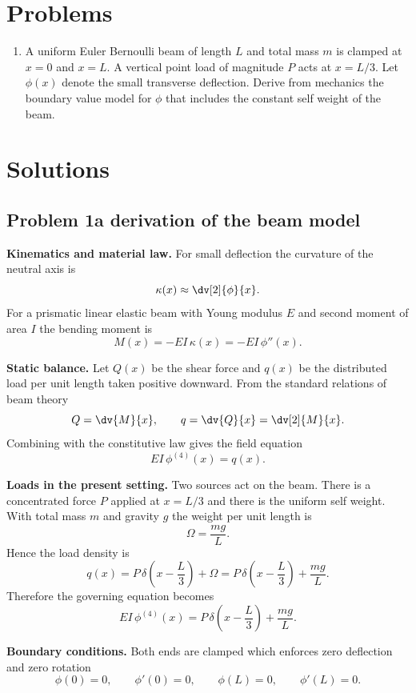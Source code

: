 \documentclass[12pt, a4paper]{article}
\begin{document}
\newpage
\section*{Problems}

\begin{enumerate}[leftmargin=1.2em,label=\arabic*.]
  \item A uniform Euler Bernoulli beam of length $L$ and total mass $m$ is clamped at $x=0$ and $x=L$.
  A vertical point load of magnitude $P$ acts at $x=L/3$.
  Let $\phi(x)$ denote the small transverse deflection.
  Derive from mechanics the boundary value model for $\phi$ that includes the constant self weight of the beam.
\end{enumerate}

\newpage
\section*{Solutions}

\subsection*{Problem 1a  derivation of the beam model}

\textbf{Kinematics and material law.}
For small deflection the curvature of the neutral axis is
\[
\kappa(x)\approx \dv[2]{\phi}{x}.
\]
For a prismatic linear elastic beam with Young modulus $E$ and second moment of area $I$ the bending moment is
\[
M(x) = - E I\, \kappa(x) = - E I\, \phi''(x).
\]

\textbf{Static balance.}
Let $Q(x)$ be the shear force and $q(x)$ be the distributed load per unit length taken positive downward.
From the standard relations of beam theory
\[
Q = \dv{M}{x},
\qquad
q = \dv{Q}{x} = \dv[2]{M}{x}.
\]
Combining with the constitutive law gives the field equation
\[
E I\, \phi^{(4)}(x) = q(x).
\]

\textbf{Loads in the present setting.}
Two sources act on the beam.
There is a concentrated force $P$ applied at $x=L/3$ and there is the uniform self weight.
With total mass $m$ and gravity $g$ the weight per unit length is
\[
\Omega = \frac{m g}{L}.
\]
Hence the load density is
\[
q(x) = P\,\delta\!\left(x-\frac{L}{3}\right) + \Omega
      = P\,\delta\!\left(x-\frac{L}{3}\right) + \frac{m g}{L}.
\]
Therefore the governing equation becomes
\[
E I\, \phi^{(4)}(x) = P\,\delta\!\left(x-\frac{L}{3}\right) + \frac{m g}{L}.
\]

\textbf{Boundary conditions.}
Both ends are clamped which enforces zero deflection and zero rotation
\[
\phi(0)=0,\qquad \phi'(0)=0,\qquad \phi(L)=0,\qquad \phi'(L)=0.
\]
\end{document}

